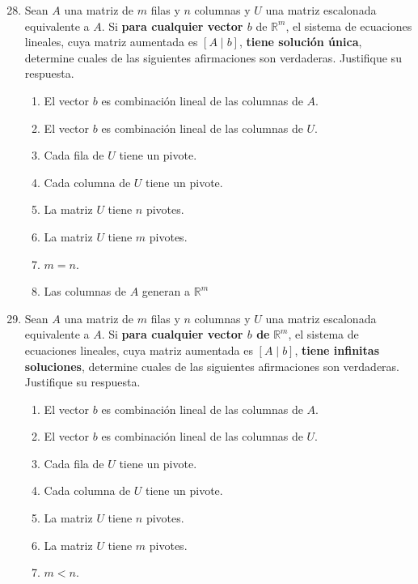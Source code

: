\documentclass{article}
\begin{document}
\begin{enumerate}
    \setcounter{enumi}{27}
    \item Sean \(A\) una matriz de \(m\) filas y \(n\) columnas y \(U\) una matriz escalonada equivalente a \(A\). Si \textbf{para cualquier vector \(b\)}
        de \(\mathbb{R}^m\), el sistema de ecuaciones lineales, cuya matriz aumentada es \(\left[A \mid b\right]\), \textbf{tiene solución única}, 
        determine cuales de las siguientes afirmaciones son verdaderas. Justifique su respuesta.
        \begin{enumerate}[label=\listAlph]
            \item El vector \(b\) es combinación lineal de las columnas de \(A\).
            \item El vector \(b\) es combinación lineal de las columnas de \(U\).
            \item Cada fila de \(U\) tiene un pivote.
            \item Cada columna de \(U\) tiene un pivote.
            \item La matriz \(U\) tiene \(n\) pivotes.
            \item La matriz \(U\) tiene \(m\) pivotes.
            \item \(m = n\).
            \item Las columnas de \(A\) generan a \(\mathbb{R}^m\)
        \end{enumerate}
    \item Sean \(A\) una matriz de \(m\) filas y \(n\) columnas y \(U\) una matriz escalonada equivalente a \(A\). 
        Si \textbf{para cualquier vector \(b\) de} \(\mathbb{R}^m\),
        el sistema de ecuaciones lineales, cuya matriz aumentada es \(\left[A \mid b\right]\), 
        \textbf{tiene infinitas soluciones},
        determine cuales de las siguientes afirmaciones son verdaderas. Justifique su respuesta.
        \begin{enumerate}[label=\listAlph]
            \item El vector \(b\) es combinación lineal de las columnas de \(A\).
            \item El vector \(b\) es combinación lineal de las columnas de \(U\).
            \item Cada fila de \(U\) tiene un pivote.
            \item Cada columna de \(U\) tiene un pivote.
            \item La matriz \(U\) tiene \(n\) pivotes.
            \item La matriz \(U\) tiene \(m\) pivotes.
            \item \(m < n\).

\end{enumerate}
\end{enumerate}
\end{document}
